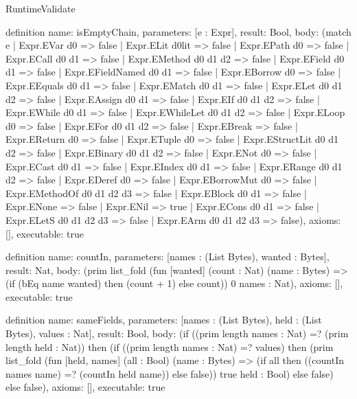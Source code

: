 \begin{lexlean}{RuntimeValidate}
\begin{semanticmodule}
definition{
  name: isEmptyChain,
  parameters: [e : Expr],
  result: Bool,
  body: (match e
    | Expr.EVar d0 => false
    | Expr.ELit d0lit => false
    | Expr.EPath d0 => false
    | Expr.ECall d0 d1 => false
    | Expr.EMethod d0 d1 d2 => false
    | Expr.EField d0 d1 => false
    | Expr.EFieldNamed d0 d1 => false
    | Expr.EBorrow d0 => false
    | Expr.EEquals d0 d1 => false
    | Expr.EMatch d0 d1 => false
    | Expr.ELet d0 d1 d2 => false
    | Expr.EAssign d0 d1 => false
    | Expr.EIf d0 d1 d2 => false
    | Expr.EWhile d0 d1 => false
    | Expr.EWhileLet d0 d1 d2 => false
    | Expr.ELoop d0 => false
    | Expr.EFor d0 d1 d2 => false
    | Expr.EBreak => false
    | Expr.EReturn d0 => false
    | Expr.ETuple d0 => false
    | Expr.EStructLit d0 d1 d2 => false
    | Expr.EBinary d0 d1 d2 => false
    | Expr.ENot d0 => false
    | Expr.ECast d0 d1 => false
    | Expr.EIndex d0 d1 => false
    | Expr.ERange d0 d1 d2 => false
    | Expr.EDeref d0 => false
    | Expr.EBorrowMut d0 => false
    | Expr.EMethodOf d0 d1 d2 d3 => false
    | Expr.EBlock d0 d1 => false
    | Expr.ENone => false
    | Expr.ENil => true
    | Expr.ECons d0 d1 => false
    | Expr.ELetS d0 d1 d2 d3 => false
    | Expr.EArm d0 d1 d2 d3 => false),
  axioms: [],
  executable: true
}

definition{
  name: countIn,
  parameters: [names : (List Bytes), wanted : Bytes],
  result: Nat,
  body: (prim list_fold (fun [wanted] (count : Nat) (name : Bytes) => (if (bEq name wanted) then (count + 1) else count)) 0 names : Nat),
  axioms: [],
  executable: true
}

definition{
  name: sameFields,
  parameters: [names : (List Bytes), held : (List Bytes), values : Nat],
  result: Bool,
  body: (if ((prim length names : Nat) =? (prim length held : Nat)) then (if ((prim length names : Nat) =? values) then (prim list_fold (fun [held, names] (all : Bool) (name : Bytes) => (if all then ((countIn names name) =? (countIn held name)) else false)) true held : Bool) else false) else false),
  axioms: [],
  executable: true
}


\end{semanticmodule}
\end{lexlean}

